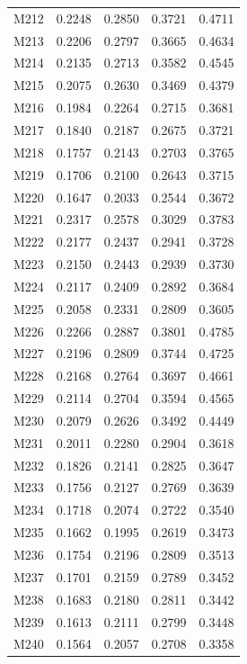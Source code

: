\begin{longtable}{lrrrr}
M212 & 0.2248 & 0.2850 & 0.3721 & 0.4711 \\
M213 & 0.2206 & 0.2797 & 0.3665 & 0.4634 \\
M214 & 0.2135 & 0.2713 & 0.3582 & 0.4545 \\
M215 & 0.2075 & 0.2630 & 0.3469 & 0.4379 \\
M216 & 0.1984 & 0.2264 & 0.2715 & 0.3681 \\
M217 & 0.1840 & 0.2187 & 0.2675 & 0.3721 \\
M218 & 0.1757 & 0.2143 & 0.2703 & 0.3765 \\
M219 & 0.1706 & 0.2100 & 0.2643 & 0.3715 \\
M220 & 0.1647 & 0.2033 & 0.2544 & 0.3672 \\
M221 & 0.2317 & 0.2578 & 0.3029 & 0.3783 \\
M222 & 0.2177 & 0.2437 & 0.2941 & 0.3728 \\
M223 & 0.2150 & 0.2443 & 0.2939 & 0.3730 \\
M224 & 0.2117 & 0.2409 & 0.2892 & 0.3684 \\
M225 & 0.2058 & 0.2331 & 0.2809 & 0.3605 \\
M226 & 0.2266 & 0.2887 & 0.3801 & 0.4785 \\
M227 & 0.2196 & 0.2809 & 0.3744 & 0.4725 \\
M228 & 0.2168 & 0.2764 & 0.3697 & 0.4661 \\
M229 & 0.2114 & 0.2704 & 0.3594 & 0.4565 \\
M230 & 0.2079 & 0.2626 & 0.3492 & 0.4449 \\
M231 & 0.2011 & 0.2280 & 0.2904 & 0.3618 \\
M232 & 0.1826 & 0.2141 & 0.2825 & 0.3647 \\
M233 & 0.1756 & 0.2127 & 0.2769 & 0.3639 \\
M234 & 0.1718 & 0.2074 & 0.2722 & 0.3540 \\
M235 & 0.1662 & 0.1995 & 0.2619 & 0.3473 \\
M236 & 0.1754 & 0.2196 & 0.2809 & 0.3513 \\
M237 & 0.1701 & 0.2159 & 0.2789 & 0.3452 \\
M238 & 0.1683 & 0.2180 & 0.2811 & 0.3442 \\
M239 & 0.1613 & 0.2111 & 0.2799 & 0.3448 \\
M240 & 0.1564 & 0.2057 & 0.2708 & 0.3358 \\
\end{longtable}
